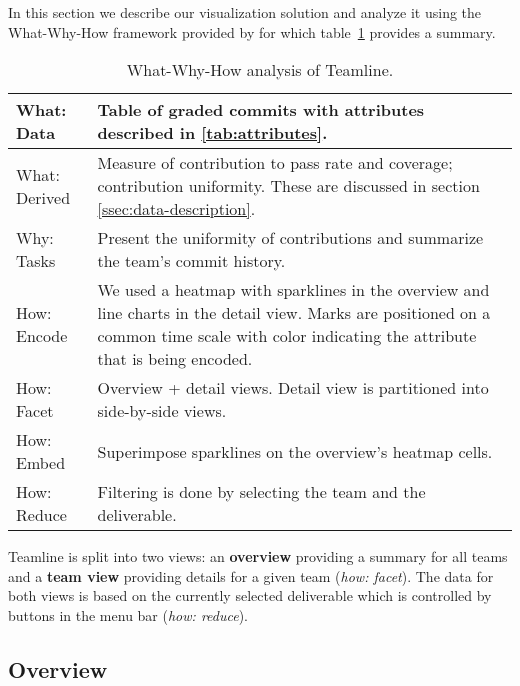 \documentclass[../manifest.tex]{subfiles}
\begin{document}
In this section we describe our visualization solution and analyze it using the What-Why-How framework provided by \cite{Munzner:2014} for which table~\ref{tab:analysis} provides a summary.

\begin{table}
  \caption{What-Why-How analysis of Teamline.}
  \label{tab:analysis}
  \begin{tabularx}{\columnwidth}{ l | X }
    \hline
    What: Data & Table of graded commits with attributes described in \ref{tab:attributes}. \\
    \hline
    What: Derived & Measure of contribution to pass rate and coverage; contribution uniformity. These are discussed in section \ref{ssec:data-description}. \\
    \hline
    Why: Tasks & Present the uniformity of contributions and summarize the team's commit history. \\
    \hline
    How: Encode & We used a heatmap with sparklines in the overview  and line charts in the detail view. Marks are positioned on a common time scale with color indicating the attribute that is being encoded.\\
    \hline
    How: Facet & Overview + detail views. Detail view is partitioned into side-by-side views. \\
    \hline
    How: Embed & Superimpose sparklines on the overview's heatmap cells. \\
    \hline
    How: Reduce & Filtering is done by selecting the team and the deliverable. \\
    \hline
  \end{tabularx}
\end{table}

Teamline is split into two views: an \textbf{overview} providing a summary for all teams and a \textbf{team view} providing details for a given team (\textit{how: facet}). The data for both views is based on the currently selected deliverable which is controlled by buttons in the menu bar (\textit{how: reduce}).

\subsection{Overview}
\end{document}
